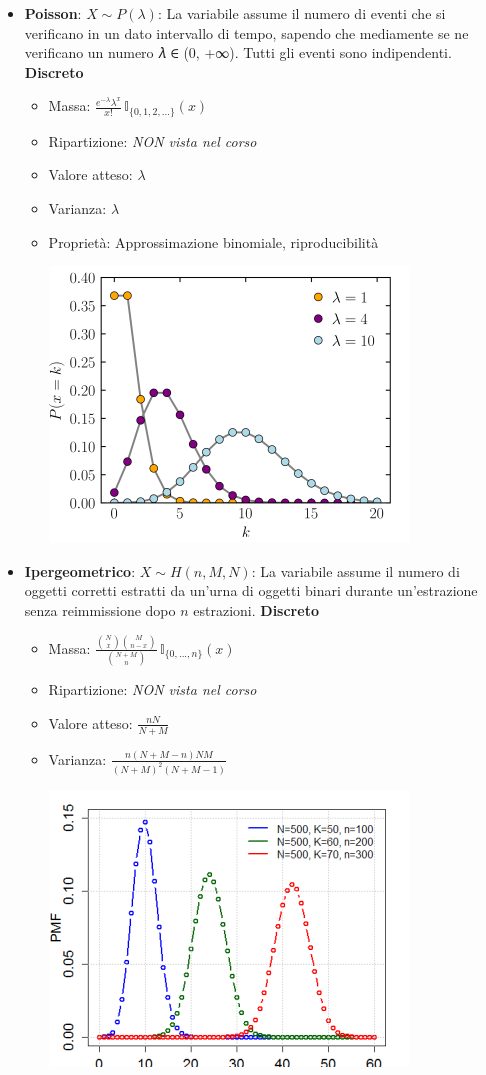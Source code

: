 \documentclass{article}
\begin{document}
\begin{itemize}
    \item \textbf{Poisson}: $X \sim P(\lambda)$: La variabile assume il numero di eventi che si veriﬁcano in un dato intervallo di tempo, sapendo che mediamente se ne veriﬁcano un numero 𝜆 ∈ (0, +∞). Tutti gli eventi sono indipendenti. \textbf{Discreto}
    \begin{itemize}
        \item Massa: $\frac{e^{-\lambda} \lambda^x}{x!} \, \mathbb{I}_{\{0, 1, 2, \dots\}}(x)$
        \item Ripartizione: \textit{NON vista nel corso}
        \item Valore atteso: $\lambda$
        \item Varianza: $\lambda$
        \item Proprietà: Approssimazione binomiale, riproducibilità
        \begin{center}
            \includegraphics[width=0.4\linewidth]{./immagini/poisson.png}
        \end{center}
    \end{itemize}

    \item \textbf{Ipergeometrico}: $X \sim H(n, M, N)$: La variabile assume il numero di oggetti corretti estratti da un’urna di oggetti binari durante un’estrazione senza reimmissione dopo $n$ estrazioni. \textbf{Discreto}
    \begin{itemize}
        \item Massa: $\frac{\binom{N}{x} \binom{M}{n-x}}{\binom{N+M}{n}} \, \mathbb{I}_{\{0, ..., n\}}(x)$
        \item Ripartizione: \textit{NON vista nel corso}
        \item Valore atteso: $\frac{n N}{N + M}$
        \item Varianza: $\frac{n (N + M - n) N M}{(N+M)^2 (N + M - 1)}$
        \begin{center}
            \includegraphics[width=0.4\linewidth]{./immagini/ipergeometrico.png}
        \end{center}
    \end{itemize}


\end{itemize}
\end{document}
